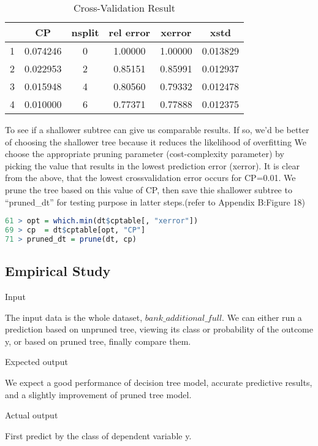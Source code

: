 \documentclass[12pt, a4paper, bibliography=totoc, english]{scrartcl}
\begin{document}
\begin{table}[!hbp]
	\centering
	\begin{tabular}{|c|c|c|c|c|c|}
		\hline
		& CP & nsplit & rel error & xerror & xstd \\
		\hline
		1 & 0.074246 & 0 & 1.00000 & 1.00000 & 0.013829\\
		\hline
		2 & 0.022953 & 2 & 0.85151 & 0.85991 & 0.012937\\
		\hline
		3 & 0.015948 & 4 & 0.80560 & 0.79332 & 0.012478\\
		\hline
		4 & 0.010000 & 6 & 0.77371 & 0.77888 & 0.012375\\
		\hline
	\end{tabular}
	\caption{Cross-Validation Result} 
\end{table}

To see if a shallower subtree can give us comparable results. If so, we’d be better of choosing the shallower tree because it reduces the likelihood of overfitting We choose the appropriate pruning parameter (cost-complexity parameter) by picking the value that results in the lowest prediction error (xerror). It is clear from the above, that the lowest cross\-validation error occurs for CP=0.01. We prune the tree based on this value of CP, then save thie shallower subtree to “pruned\_dt” for testing purpose in latter steps.(refer to Appendix B:Figure 18)

\begin{lstlisting}[language = R]
61 > opt = which.min(dt$cptable[, "xerror"])
69 > cp  = dt$cptable[opt, "CP"]
71 > pruned_dt = prune(dt, cp)
\end{lstlisting}


\subsection{Empirical Study}

\textbullet\quad Input

The input data is the whole dataset, $bank\_additional\_full$. We can either run a prediction based on unpruned tree, viewing its class or probability of the outcome y, or based on pruned tree, finally compare them. 

\textbullet\quad Expected output 

We expect a good performance of decision tree model, accurate predictive results, and a slightly improvement of pruned tree model.

\textbullet\quad Actual output 

First predict by the class of dependent variable y.
\end{document}
